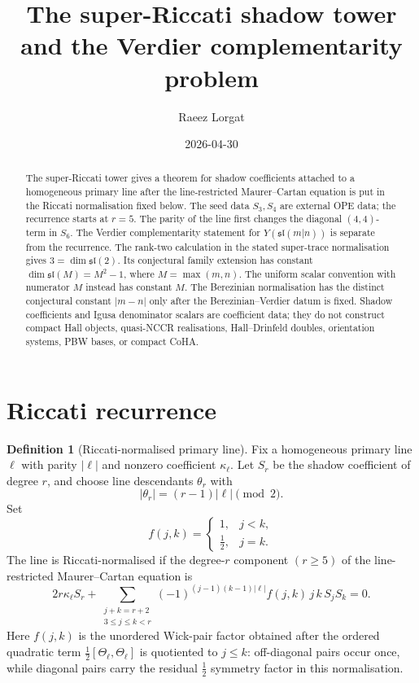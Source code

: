 \documentclass[11pt]{amsart}
\title[Super-Riccati shadow tower]{The super-Riccati shadow tower and the
Verdier complementarity problem}
\author{Raeez Lorgat}
\date{2026-04-30}
\providecommand{\fsl}{\mathfrak{sl}}
\theoremstyle{definition}
\newtheorem{definition}[theorem]{Definition}
\theoremstyle{remark}
\begin{document}
\begin{abstract}
The super-Riccati tower gives a theorem for shadow coefficients attached
to a homogeneous primary line after the line-restricted Maurer--Cartan
equation is put in the Riccati normalisation fixed below. The seed data
\(S_3,S_4\) are external OPE data; the recurrence starts at \(r=5\).
The parity of the line first changes the diagonal \((4,4)\)-term in
\(S_6\). The Verdier complementarity statement for \(Y(\fsl(m|n))\) is
separate from the recurrence. The rank-two calculation in the stated
super-trace normalisation gives \(3=\dim\fsl(2)\). Its conjectural family
extension has constant \(\dim\fsl(M)=M^2-1\), where \(M=\max(m,n)\).
The uniform scalar convention with numerator \(M\) instead has constant
\(M\). The Berezinian normalisation has the distinct conjectural
constant \(|m-n|\) only after the Berezinian--Verdier datum is fixed.
Shadow coefficients and Igusa denominator scalars are coefficient data;
they do not construct compact Hall objects, quasi-NCCR realisations,
Hall--Drinfeld doubles, orientation systems, PBW bases, or compact CoHA.
\end{abstract}
\maketitle

\section{Riccati recurrence}

\begin{definition}[Riccati-normalised primary line]
Fix a homogeneous primary line \(\ell\) with parity \(|\ell|\) and
nonzero coefficient \(\kappa_\ell\). Let \(S_r\) be the shadow coefficient
of degree \(r\), and choose line descendants \(\theta_r\) with
\[
        |\theta_r|=(r-1)|\ell|\pmod 2 .
\]
Set
\[
        f(j,k)=
        \begin{cases}
        1, & j<k,\\
        \frac12, & j=k.
        \end{cases}
\]
The line is Riccati-normalised if the degree-\(r\) component
\((r\geq5)\) of the line-restricted Maurer--Cartan equation is
\[
        2r\kappa_\ell S_r
        +
        \sum_{\substack{j+k=r+2\\3\leq j\leq k<r}}
        (-1)^{(j-1)(k-1)|\ell|}
        f(j,k)\,j\,k\,S_jS_k
        =
        0 .
\]
Here \(f(j,k)\) is the unordered Wick-pair factor obtained after the
ordered quadratic term \(\frac12[\Theta_\ell,\Theta_\ell]\) is quotiented
to \(j\leq k\): off-diagonal pairs occur once, while diagonal pairs carry
the residual \(\frac12\) symmetry factor in this normalisation.
\end{definition}
\end{document}
